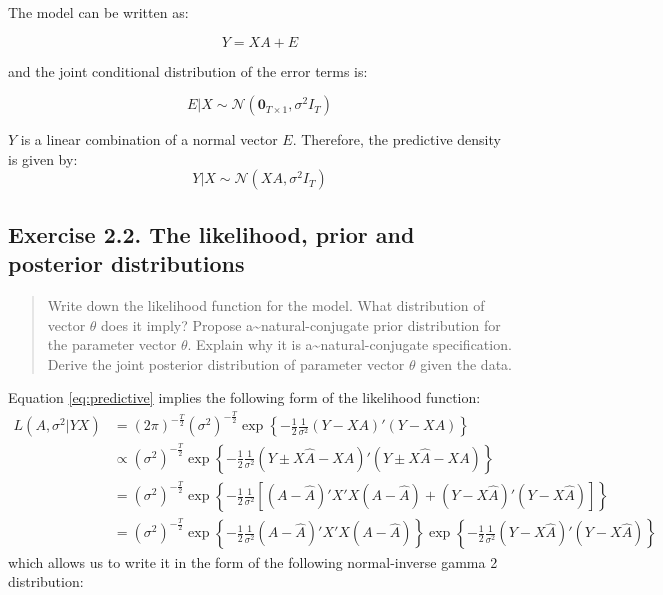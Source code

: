 \documentclass[
  letterpaper,
  DIV=11,
  numbers=noendperiod]{scrreprt}
\begin{document}
The model can be written as:

\[ Y=XA + E\]

and the joint conditional distribution of the error terms is:

\[ E|X\sim\mathcal{N}\left(\mathbf{0}_{T\times 1},\sigma^2 I_T\right) \]

\(Y\) is a linear combination of a normal vector \(E\). Therefore, the
predictive density is given by: \begin{equation}\label{eq:predictive}
Y|X\sim\mathcal{N}\left(XA,\sigma^2 I_T\right)
\end{equation}

\hypertarget{exercise-2.2.-the-likelihood-prior-and-posterior-distributions}{%
\subsection*{Exercise 2.2. The likelihood, prior and posterior
distributions}\label{exercise-2.2.-the-likelihood-prior-and-posterior-distributions}}

\begin{quote}
Write down the likelihood function for the model. What distribution of
vector \(\theta\) does it imply? Propose
a\textasciitilde natural-conjugate prior distribution for the parameter
vector \(\theta\). Explain why it is a\textasciitilde natural-conjugate
specification. Derive the joint posterior distribution of parameter
vector \(\theta\) given the data.
\end{quote}

Equation \eqref{eq:predictive} implies the following form of the
likelihood function: \begin{align*}
L(A,\sigma^2|YX) &= \left(2\pi\right)^{-\frac{T}{2}}\left(\sigma^2\right)^{-\frac{T}{2}}\exp\left\{-\frac{1}{2}\frac{1}{\sigma^2}(Y-XA)'(Y-XA)\right\}\\
&\propto \left(\sigma^2\right)^{-\frac{T}{2}}\exp\left\{-\frac{1}{2}\frac{1}{\sigma^2}(Y\pm X\hat{A}-XA)'(Y\pm X\hat{A}-XA)\right\}\\
&= \left(\sigma^2\right)^{-\frac{T}{2}}\exp\left\{-\frac{1}{2}\frac{1}{\sigma^2}\left[(A-\hat{A})'X'X(A-\hat{A}) + (Y-X\hat{A})'(Y-X\hat{A})\right]\right\}\\
&= \left(\sigma^2\right)^{-\frac{T}{2}}\exp\left\{-\frac{1}{2}\frac{1}{\sigma^2}(A-\hat{A})'X'X(A-\hat{A})\right\} \exp\left\{-\frac{1}{2}\frac{1}{\sigma^2}(Y-X\hat{A})'(Y-X\hat{A})\right\}
\end{align*} which allows us to write it in the form of the following
normal-inverse gamma 2 distribution:
\end{document}
